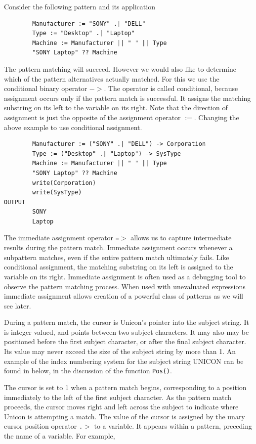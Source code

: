 \documentclass[letterpaper,12pt]{article}
\begin{document}
Consider the following pattern and its application

\begin{verbatim}
        Manufacturer := "SONY" .| "DELL"
        Type := "Desktop" .| "Laptop"
        Machine := Manufacturer || " " || Type
        "SONY Laptop" ?? Machine
\end{verbatim}

\noindent
The pattern matching will succeed. However we would also like to
determine which of the pattern alternatives actually matched. For this
we use the conditional binary operator \(-\!\!>\). The operator is
called conditional, because assignment occurs only if the pattern
match is successful. It assigns the matching substring on its left to
the variable on its right. Note that the direction of assignment is
just the opposite of the assignment operator $:=$. Changing the above
example to use conditional assignment.

\begin{verbatim}
        Manufacturer := ("SONY" .| "DELL") -> Corporation
        Type := ("Desktop" .| "Laptop") -> SysType
        Machine := Manufacturer || " " || Type
        "SONY Laptop" ?? Machine
        write(Corporation)
        write(SysType)
OUTPUT
        SONY
        Laptop
\end{verbatim}

The immediate assignment operator \texttt{=$>$} allows us to capture
intermediate results during the pattern match. Immediate assignment
occurs whenever a subpattern matches, even if the entire pattern match
ultimately fails. Like conditional assignment, the matching substring
on its left is assigned to the variable on its right. Immediate
assignment is often used as a debugging tool to observe the pattern
matching process. When used with unevaluated expressions immediate
assignment allows creation of a powerful class of patterns as we will
see later.

During a pattern match, the cursor is Unicon's pointer into the
subject string. It is integer valued, and points between two subject
characters. It may also may be positioned before the first subject
character, or after the final subject character. Its value may never
exceed the size of the subject string by more than 1.  An example of
the index numbering system for the subject string UNICON can be found
in below, in the discussion of the function \texttt{Pos()}.

The cursor is set to 1 when a pattern match begins, corresponding to a
position immediately to the left of the first subject character. As
the pattern match proceeds, the cursor moves right and left across the
subject to indicate where Unicon is attempting a match. The value of
the cursor is assigned by the unary cursor position operator
\texttt{.$>$} to a variable. It appears within a pattern, preceding the
name of a variable. For example,
\end{document}
